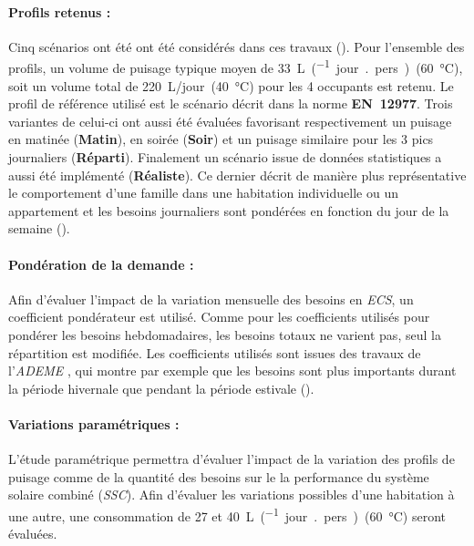 \paragraph{Profils retenus :} %
\label{par:profils_retenus}
Cinq scénarios ont été ont été considérés dans ces travaux (). Pour
l’ensemble des profils, un volume de puisage typique moyen de
\SI{33}{\liter\per(jour {.} pers)}~(\SI{60}{\celsius}), soit un
volume total de \SI{220}{\liter/jour}~(\SI{40}{\celsius}) pour les 4 occupants est
retenu. Le profil de référence utilisé est le scénario décrit dans la norme
\textbf{EN~12977}. Trois variantes de celui-ci ont aussi été évaluées favorisant
respectivement un puisage en matinée (\textbf{Matin}), en soirée (\textbf{Soir}) et un
puisage similaire pour les 3 pics journaliers (\textbf{Réparti}). Finalement un scénario
issue de données statistiques \parencite{ADEME2016} a aussi été implémenté
(\textbf{Réaliste}). Ce dernier décrit de manière plus représentative le comportement
d’une famille dans une habitation individuelle ou un appartement et les besoins
journaliers sont pondérées en fonction du jour de la semaine ().

\paragraph{Pondération de la demande :} %
\label{par:ponderation_de_la_demande}
Afin d’évaluer l’impact de la variation mensuelle des besoins en \textit{ECS}, un
coefficient pondérateur est utilisé. Comme pour les coefficients utilisés pour pondérer
les besoins hebdomadaires, les besoins totaux ne varient pas, seul la répartition est
modifiée. Les coefficients utilisés sont issues des travaux de l’\textit{ADEME}
\parencite{ADEME2016}, qui montre par exemple que les besoins sont plus importants durant
la période hivernale que pendant la période estivale ().

\paragraph{Variations paramétriques :} %
\label{par:variations_parametriques}
L’étude paramétrique permettra d’évaluer l’impact de la variation des profils de puisage
comme de la quantité des besoins sur le la performance du système solaire combiné
(\textit{SSC}). Afin d’évaluer les variations possibles d’une habitation à une autre, une
consommation de 27 et \SI{40}{\liter\per(jour {.} pers)}~(\SI{60}{\celsius}) seront évaluées.



